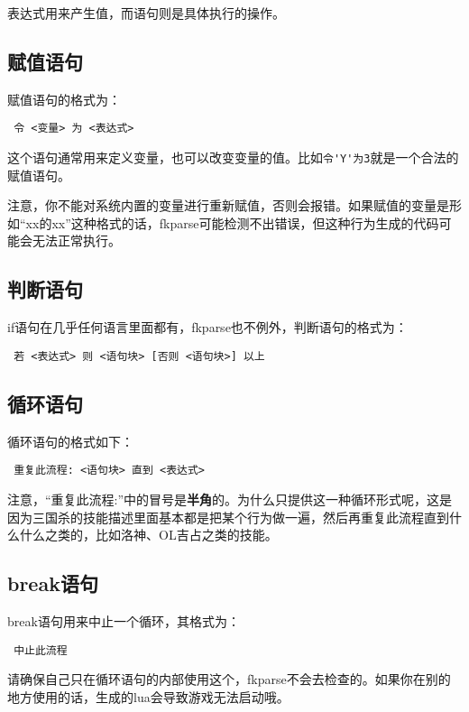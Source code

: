 表达式用来产生值，而语句则是具体执行的操作。

\subsection{赋值语句}

赋值语句的格式为：

\begin{verbatim}
 令 <变量> 为 <表达式>
\end{verbatim}

这个语句通常用来定义变量，也可以改变变量的值。比如\verb|令'Y'为3|就是一个合法的赋值语句。

注意，你不能对系统内置的变量进行重新赋值，否则会报错。如果赋值的变量是形如“xx的xx”这种格式的话，fkparse可能检测不出错误，但这种行为生成的代码可能会无法正常执行。

\subsection{判断语句}

if语句在几乎任何语言里面都有，fkparse也不例外，判断语句的格式为：

\begin{verbatim}
 若 <表达式> 则 <语句块> [否则 <语句块>] 以上
\end{verbatim}

\subsection{循环语句}

循环语句的格式如下：

\begin{verbatim}
 重复此流程: <语句块> 直到 <表达式>
\end{verbatim}

注意，“重复此流程:”中的冒号是\textbf{半角}的。为什么只提供这一种循环形式呢，这是因为三国杀的技能描述里面基本都是把某个行为做一遍，然后再重复此流程直到什么什么之类的，比如洛神、OL吉占之类的技能。

\subsection{break语句}

break语句用来中止一个循环，其格式为：

\begin{verbatim}
 中止此流程
\end{verbatim}

请确保自己只在循环语句的内部使用这个，fkparse不会去检查的。如果你在别的地方使用的话，生成的lua会导致游戏无法启动哦。

